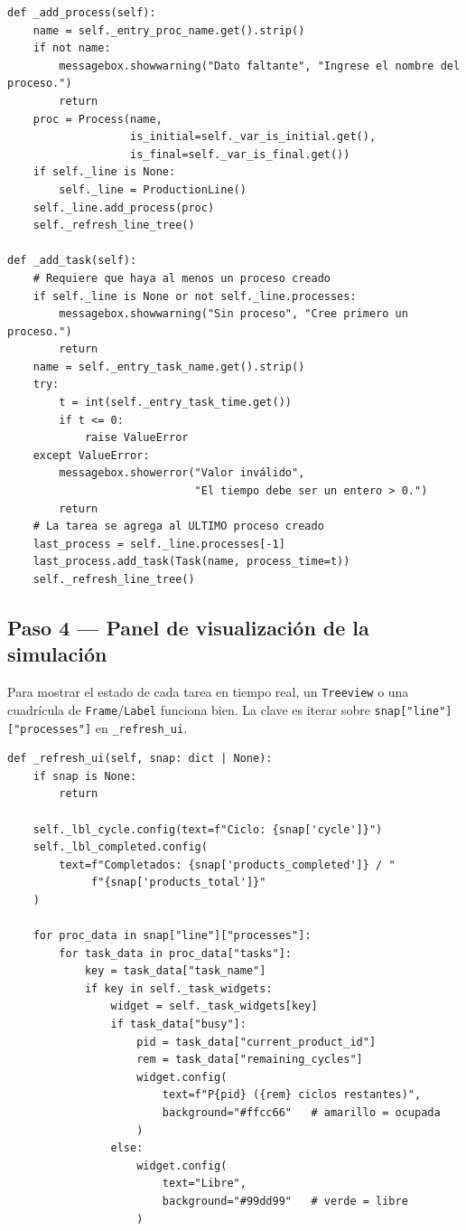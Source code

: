 \documentclass[12pt,letterpaper]{article}
\begin{document}
\begin{lstlisting}
def _add_process(self):
    name = self._entry_proc_name.get().strip()
    if not name:
        messagebox.showwarning("Dato faltante", "Ingrese el nombre del proceso.")
        return
    proc = Process(name,
                   is_initial=self._var_is_initial.get(),
                   is_final=self._var_is_final.get())
    if self._line is None:
        self._line = ProductionLine()
    self._line.add_process(proc)
    self._refresh_line_tree()

def _add_task(self):
    # Requiere que haya al menos un proceso creado
    if self._line is None or not self._line.processes:
        messagebox.showwarning("Sin proceso", "Cree primero un proceso.")
        return
    name = self._entry_task_name.get().strip()
    try:
        t = int(self._entry_task_time.get())
        if t <= 0:
            raise ValueError
    except ValueError:
        messagebox.showerror("Valor inválido",
                             "El tiempo debe ser un entero > 0.")
        return
    # La tarea se agrega al ULTIMO proceso creado
    last_process = self._line.processes[-1]
    last_process.add_task(Task(name, process_time=t))
    self._refresh_line_tree()
\end{lstlisting}

\subsection{Paso 4 — Panel de visualización de la simulación}

Para mostrar el estado de cada tarea en tiempo real, un \texttt{Treeview} o
una cuadrícula de \texttt{Frame}/\texttt{Label} funciona bien. La clave es
iterar sobre \texttt{snap["line"]["processes"]} en \texttt{\_refresh\_ui}.

\begin{lstlisting}
def _refresh_ui(self, snap: dict | None):
    if snap is None:
        return

    self._lbl_cycle.config(text=f"Ciclo: {snap['cycle']}")
    self._lbl_completed.config(
        text=f"Completados: {snap['products_completed']} / "
             f"{snap['products_total']}"
    )

    for proc_data in snap["line"]["processes"]:
        for task_data in proc_data["tasks"]:
            key = task_data["task_name"]
            if key in self._task_widgets:
                widget = self._task_widgets[key]
                if task_data["busy"]:
                    pid = task_data["current_product_id"]
                    rem = task_data["remaining_cycles"]
                    widget.config(
                        text=f"P{pid} ({rem} ciclos restantes)",
                        background="#ffcc66"   # amarillo = ocupada
                    )
                else:
                    widget.config(
                        text="Libre",
                        background="#99dd99"   # verde = libre
                    )
\end{lstlisting}
\end{document}
